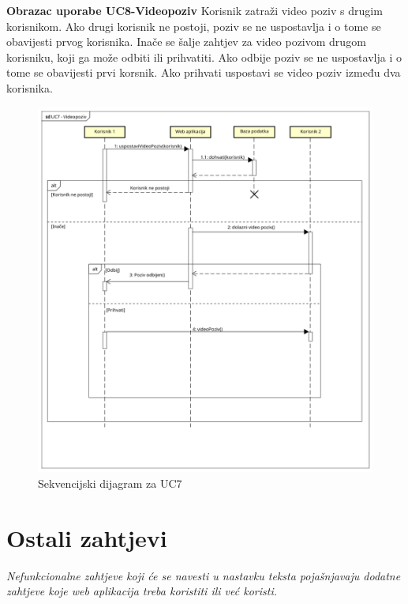 				\eject

				\noindent
				\textbf{Obrazac uporabe UC8-Videopoziv}\newline
					{Korisnik zatraži video poziv s drugim korisnikom. Ako drugi korisnik ne postoji, poziv se ne uspostavlja i o tome se obavijesti prvog korisnika. Inače se šalje zahtjev za video pozivom drugom korisniku, koji ga može odbiti ili prihvatiti. Ako odbije poziv se ne uspostavlja i o tome se obavijesti prvi korsnik. Ako prihvati uspostavi se video poziv između dva korisnika.}
				

				\begin{figure}[H]
					\includegraphics[scale= 0.5]{slike/sekvencijski_dijagramUC7.png}
					\centering
					\caption{Sekvencijski dijagram za UC7}
					\label{fig:Sekvencijski dijagram za UC7}
				\end{figure}
				
				\eject
			
			\section{Ostali zahtjevi}
		
			\textit{Nefunkcionalne zahtjeve koji će se navesti u nastavku teksta pojašnjavaju dodatne zahtjeve koje web aplikacija treba koristiti ili već koristi.}
			
